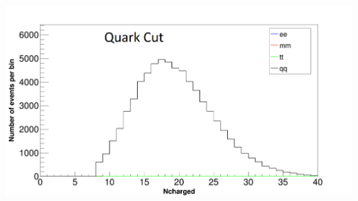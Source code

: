 \begin{frame}
\begin{minipage}{0.48\linewidth}
			\includegraphics[width=1.1\linewidth]{graphics/Ncharged_vergleich_qq}
		\end{minipage}
\end{frame}
